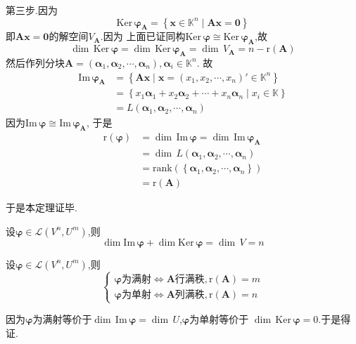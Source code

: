 \begin{formal}
\begin{Proof}
第三步.因为
\[
\mathrm{Ker}\,\bm{\varphi}_{\bm{A}}
=\left\{\bm{x}\in \mathbb{K}^n\mid\bm{Ax}=\bm{0}
\right\}
\]
即$\bm{Ax}=\bm{0}$的解空间$V_{\bm{A}}$.因为
上面已证同构$\mathrm{Ker}\,\bm{\varphi}\cong \mathrm{Ker}\,\bm{\varphi}_{\bm{A}}$,故
\[
\dim\,\mathrm{Ker}\,\bm{\varphi}=\dim\,\mathrm{Ker}\,\bm{\varphi}_{\bm{A}}=\dim\,V_{\bm{A}}=n-\mathrm{r}\left(\bm{A}
\right)
\]
然后作列分块$\bm{A}=\left(\bm{\alpha}_1,\bm{\alpha}_2,\cdots,\bm{\alpha}_n\right),\bm{\alpha}_i\in \mathbb{K}^n.$
故
\begin{align*}
\mathrm{Im}\,\bm{\varphi}_{\bm{A}}&=\left\{
    \bm{Ax}\mid\bm{x}=\left(x_1,x_2,\cdots,x_n\right)'\in \mathbb{K}^n
\right\}\\
&=\left\{x_1\bm{\alpha}_1+x_2\bm{\alpha}_2+\cdots+
x_n\bm{\alpha}_n\mid x_i\in \mathbb{K}\right\}\\
&=L\left(\bm{\alpha}_1,\bm{\alpha}_2,\cdots,\bm{\alpha}_n\right)
\end{align*}
因为$\mathrm{Im}\,\bm{\varphi}\cong \mathrm{Im}\,\bm{\varphi}_{\bm{A}}$,
于是
\begin{align*}
    \mathrm{r}\left(\bm{\varphi}\right)&=\dim\,\mathrm{Im}\,\bm{\varphi}=\dim\,\mathrm{Im}\,\bm{\varphi}_{\bm{A}}\\
&=\dim\,L\left(\bm{\alpha}_1,\bm{\alpha}_2,\cdots,\bm{\alpha}_n\right)
\\
&=\mathrm{rank}\left(\left\{\bm{\alpha}_1,\bm{\alpha}_2,\cdots,\bm{\alpha}_n\right\}\right)\\
&=\mathrm{r}\left(\bm{A}\right)
\end{align*}

于是本定理证毕.
\end{Proof}
\end{formal}
\begin{green}
\begin{corollary}[线性映射维数公式]\label{cor:线性映射维数公式}
    设$\bm{\varphi}\in \mathcal{L}\left(V^n,U^m\right)$,则
    \[\dim \mathrm{Im}\,\bm{\varphi}+\dim
     \mathrm{Ker}\,\bm{\varphi}=\dim\,V=n
     \]
\end{corollary}
\end{green}
\begin{green}
\begin{corollary}[秩对线性映射的刻画]\label{cor:秩对线性映射的刻画}
        设$\bm{\varphi}\in \mathcal{L}\left(V^n,U^m\right)$,则
    \[
    \begin{cases*}
    \bm{\varphi}\text{为满射}\Longleftrightarrow
    \bm{A}\text{行满秩},\mathrm{r}\left(\bm{A}\right)=m\\
    \bm{\varphi}\text{为单射}\Longleftrightarrow
    \bm{A}\text{列满秩},\mathrm{r}\left(\bm{A}\right)=n
    \end{cases*}
    \]
\end{corollary}
\begin{Proof}
因为$\bm{\varphi}$为满射等价于$\dim\,\mathrm{Im}\,\bm{\varphi}=\dim\,U$,$\bm{\varphi}$为单射等价于
$\dim\,\mathrm{Ker}\,\bm{\varphi}=0.$于是得证.
\end{Proof}
\end{green}

